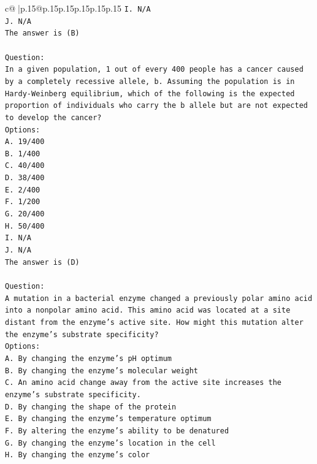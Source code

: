 \documentclass{article}
\begin{document}
{\begin{supertabular}{c@{$\;$}|p{.15\linewidth}@{}p{.15\linewidth}p{.15\linewidth}p{.15\linewidth}p{.15\linewidth}p{.15\linewidth}}
{{{\texttt{I. N/A} \\
\texttt{J. N/A} \\
\texttt{The answer is (B)} \\
\\ 
\texttt{Question:} \\
\texttt{In a given population, 1 out of every 400 people has a cancer caused by a completely recessive allele, b. Assuming the population is in Hardy{-}Weinberg equilibrium, which of the following is the expected proportion of individuals who carry the b allele but are not expected to develop the cancer?} \\
\texttt{Options:} \\
\texttt{A. 19/400} \\
\texttt{B. 1/400} \\
\texttt{C. 40/400} \\
\texttt{D. 38/400} \\
\texttt{E. 2/400} \\
\texttt{F. 1/200} \\
\texttt{G. 20/400} \\
\texttt{H. 50/400} \\
\texttt{I. N/A} \\
\texttt{J. N/A} \\
\texttt{The answer is (D)} \\
\\ 
\texttt{Question:} \\
\texttt{A mutation in a bacterial enzyme changed a previously polar amino acid into a nonpolar amino acid. This amino acid was located at a site distant from the enzyme’s active site. How might this mutation alter the enzyme’s substrate specificity?} \\
\texttt{Options:} \\
\texttt{A. By changing the enzyme’s pH optimum} \\
\texttt{B. By changing the enzyme's molecular weight} \\
\texttt{C. An amino acid change away from the active site increases the enzyme's substrate specificity.} \\
\texttt{D. By changing the shape of the protein} \\
\texttt{E. By changing the enzyme's temperature optimum} \\
\texttt{F. By altering the enzyme's ability to be denatured} \\
\texttt{G. By changing the enzyme’s location in the cell} \\
\texttt{H. By changing the enzyme's color} \\
}}}
\end{supertabular}}
\end{document}
